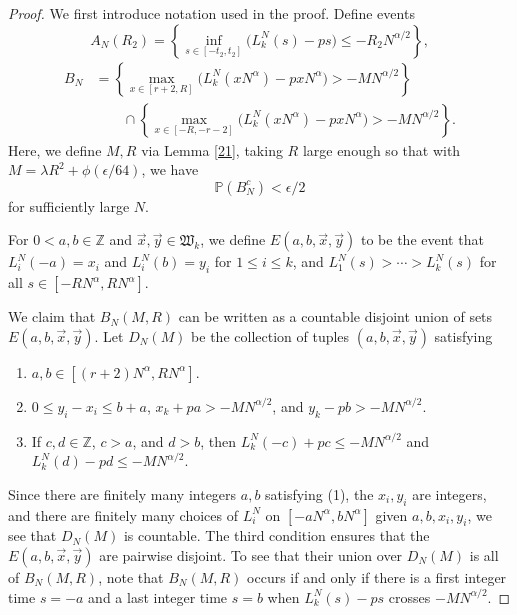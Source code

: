 	\begin{proof}
		We first introduce notation used in the proof. Define events
		\[
		A_N(R_2) = \left\{\inf_{s \in [ -t_2, t_2 ]}\big(L^N_k(s) - p s \big) \leq - R_2N^{\alpha/2}\right\},
		\]
		\begin{align*}
		B_N &= \left\{ \max_{x\in [r+2, R]} \big(L^N_k(xN^\alpha) - pxN^\alpha\big) > -MN^{\alpha/2} \right\}\\
		&\qquad \cap \left\{ \max_{x\in [-R, -r-2]} \big(L^N_k(xN^\alpha) - pxN^\alpha\big) > -MN^{\alpha/2} \right\}.
		\end{align*}
		Here, we define $M,R$ via Lemma \ref{21}, taking $R$ large enough so that with $M = \lambda R^2 + \phi(\epsilon/64)$, we have 
		\begin{equation}\label{4.3Bbound}
		\mathbb{P}(B_N^c) < \epsilon/2
		\end{equation} 
		for sufficiently large $N$. 
		
		For $0<a,b\in\mathbb{Z}$ and $\vec{x},\vec{y}\in\mathfrak{W}_k$, we define $E(a,b,\vec{x},\vec{y})$ to be the event that $L_i^N(-a) = x_i$ and $L_i^N(b) = y_i$ for $1\leq i\leq k$, and $L_1^N(s) > \cdots > L_k^N(s)$ for all $s\in[-RN^\alpha,RN^\alpha]$.
		
		We claim that $B_N(M,R)$ can be written as a countable disjoint union of sets $E(a,b,\vec{x},\vec{y})$. Let $D_N(M)$ be the collection of tuples $(a,b,\vec{x},\vec{y})$ satisfying 
		\begin{enumerate}[label=(\arabic*)]
			
			\item $a,b\in[(r+2)N^\alpha,RN^\alpha]$.
			
			\item $0 \leq y_i - x_i \leq b+a$, $x_k + pa > - MN^{\alpha/2}$, and $y_k - pb > - MN^{\alpha/2}$.
			
			\item If $c,d\in\mathbb{Z}$, $c > a$, and $d>b$, then $L_k^N(-c) + pc \leq -MN^{\alpha/2}$ and $L_k^N(d) - pd \leq -MN^{\alpha/2}$.
			
		\end{enumerate} 
		Since there are finitely many integers $a,b$ satisfying (1), the $x_i,y_i$ are integers, and there are finitely many choices of $L_i^N$ on $[-aN^\alpha, bN^\alpha]$ given $a,b,x_i,y_i$, we see that $D_N(M)$ is countable. The third condition ensures that the $E(a,b,\vec{x},\vec{y})$ are pairwise disjoint. To see that their union over $D_N(M)$ is all of $B_N(M,R)$, note that $B_N(M,R)$ occurs if and only if there is a first integer time $s=-a$ and a last integer time $s=b$ when $L_k^N(s)-ps$ crosses $-MN^{\alpha/2}$.
		

\end{proof}
